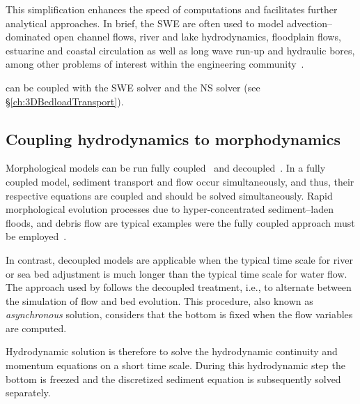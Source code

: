 This simplification enhances the speed of computations and
facilitates further analytical approaches. In brief, the SWE are often
used to model advection--dominated open channel flows, river and lake
hydrodynamics, floodplain flows, estuarine and coastal circulation as well
as long wave run-up and hydraulic bores, among
other problems of interest within the engineering community~\cite{Vreugdenhil:94}.

\gaia{} can be coupled with the SWE solver  and the NS solver  (see \S\ref{ch:3DBedloadTransport}).

\subsection{Coupling hydrodynamics to morphodynamics}
Morphological models can be run fully coupled~\cite{cao02} and decoupled~\cite{vriend87}. In a fully coupled model, sediment
transport and flow occur simultaneously, and thus, their respective
equations are coupled and should be solved simultaneously. Rapid morphological evolution processes due
to hyper-concentrated sediment--laden floods, and debris flow are typical
examples were the fully coupled approach must be employed~\cite{Frac02}.

In contrast, decoupled models are applicable when the typical time scale for river or sea bed adjustment
is much longer than the typical time scale for water flow. The approach used by \gaia{} follows the decoupled treatment, i.e., to alternate between the simulation of flow and bed evolution. This procedure, also known as \textit{asynchronous} solution, considers that the bottom is fixed when the flow variables are computed.

Hydrodynamic solution is therefore to solve the hydrodynamic continuity and momentum equations on a short time scale.
During this hydrodynamic step the bottom is freezed and the discretized sediment equation is subsequently solved separately.


